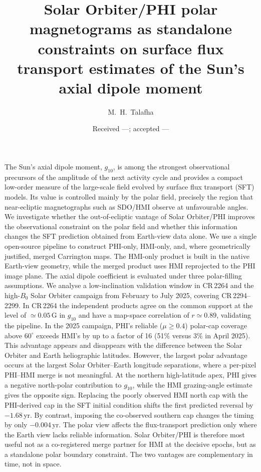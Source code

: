 \documentclass{aa}
\begin{document}
\title{Solar Orbiter/PHI polar magnetograms as standalone constraints on surface flux transport estimates of the Sun's axial dipole moment}

\author{M.~H.~Talafha}


\date{Received ---; accepted ---}

\abstract
{The Sun's axial dipole moment, $g_{10}$, is among the strongest observational precursors of the amplitude of the next activity cycle and provides a compact low-order measure of the large-scale field evolved by surface flux transport (SFT) models. Its value is controlled mainly by the polar field, precisely the region that near-ecliptic magnetographs such as SDO/HMI observe at unfavourable angles.}
{We investigate whether the out-of-ecliptic vantage of Solar Orbiter/PHI improves the observational constraint on the polar field and whether this information changes the SFT prediction obtained from Earth-view data alone.}
{We use a single open-source pipeline to construct PHI-only, HMI-only, and, where geometrically justified, merged Carrington maps. The HMI-only product is built in the native Earth-view geometry, while the merged product uses HMI reprojected to the PHI image plane. The axial dipole coefficient is evaluated under three polar-filling assumptions. We analyse a low-inclination validation window in CR\,2264 and the high-$B_0$ Solar Orbiter campaign from February to July 2025, covering CR\,2294--2299.}
{In CR\,2264 the independent products agree on the common support at the level of $\simeq0.05$\,G in $g_{10}$ and have a map-space correlation of $r\simeq0.89$, validating the pipeline. In the 2025 campaign, PHI's reliable ($\mu\ge0.4$) polar-cap coverage above $60^{\circ}$ exceeds HMI's by up to a factor of 16 (51\% versus 3\% in April 2025). This advantage appears and disappears with the difference between the Solar Orbiter and Earth heliographic latitudes. However, the largest polar advantage occurs at the largest Solar Orbiter--Earth longitude separations, where a per-pixel PHI--HMI merge is not meaningful. At the northern high-latitude apex, PHI gives a negative north-polar contribution to $g_{10}$, while the HMI grazing-angle estimate gives the opposite sign. Replacing the poorly observed HMI north cap with the PHI-derived cap in the SFT initial condition shifts the first predicted reversal by $-1.68$\,yr. By contrast, imposing the co-observed southern cap changes the timing by only $-0.004$\,yr.}
{The polar view affects the flux-transport prediction only where the Earth view lacks reliable information. Solar Orbiter/PHI is therefore most useful not as a co-registered merge partner for HMI at the decisive epochs, but as a standalone polar boundary constraint. The two vantages are complementary in time, not in space.}
\end{document}
